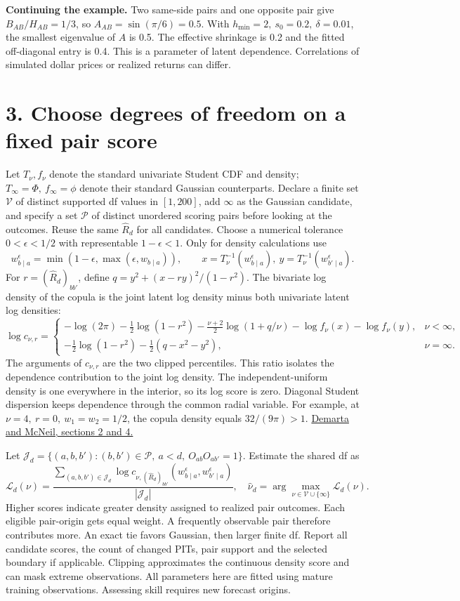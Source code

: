 \documentclass[11pt,letterpaper]{article}
\newcommand{\sect}[1]{\section*{\color{ink}#1}}
\newcommand{\lead}[1]{\textbf{\textcolor{accent}{#1}}}
\newcommand{\edge}{\mathcal P}
\newcommand{\src}[2]{\href{#1}{#2}}
\begin{document}
\lead{Continuing the example.} Two same-side pairs and one opposite pair give \(B_{AB}/H_{AB}=1/3\), so \(A_{AB}=\sin(\pi/6)=0.5\). With \(h_{\min}=2,\ s_0=0.2,\ \delta=0.01\), the smallest eigenvalue of \(A\) is 0.5. The effective shrinkage is 0.2 and the fitted off-diagonal entry is 0.4. This is a parameter of latent dependence. Correlations of simulated dollar prices or realized returns can differ.

\newpage
\sect{3. Choose degrees of freedom on a fixed pair score}
Let \(T_\nu,f_\nu\) denote the standard univariate Student CDF and density; \(T_\infty=\Phi,\ f_\infty=\phi\) denote their standard Gaussian counterparts. Declare a finite set \(\mathcal V\) of distinct supported df values in \( [1,200] \), add \(\infty\) as the Gaussian candidate, and specify a set \(\edge\) of distinct unordered scoring pairs before looking at the outcomes. Reuse the same \(\widehat R_d\) for all candidates. Choose a numerical tolerance \(0<\epsilon<1/2\) with representable \(1-\epsilon<1\). Only for density calculations use
\[
 w^\epsilon_{b\mid a}=\min(1-\epsilon,\max(\epsilon,w_{b\mid a})),
 \qquad x=T_\nu^{-1}(w^\epsilon_{b\mid a}),\
 y=T_\nu^{-1}(w^\epsilon_{b'\mid a}).
\]
For \(r=(\widehat R_d)_{bb'}\), define \(q=y^2+(x-ry)^2/(1-r^2)\). The bivariate log density of the copula is the joint latent log density minus both univariate latent log densities:
\[
 \log c_{\nu,r}=
 \begin{cases}
 -\log(2\pi)-\tfrac12\log(1-r^2)-\tfrac{\nu+2}{2}\log(1+q/\nu)
 -\log f_\nu(x)-\log f_\nu(y), & \nu<\infty,\\[2pt]
 -\tfrac12\log(1-r^2)-\tfrac12(q-x^2-y^2), &\nu=\infty .
 \end{cases}
\]
The arguments of \(c_{\nu,r}\) are the two clipped percentiles. This ratio isolates the dependence contribution to the joint log density. The independent-uniform density is one everywhere in the interior, so its log score is zero. Diagonal Student dispersion keeps dependence through the common radial variable. For example, at \(\nu=4,\ r=0,\ w_1=w_2=1/2\), the copula density equals \(32/(9\pi)>1\). \src{https://doi.org/10.1111/j.1751-5823.2005.tb00254.x}{Demarta and McNeil, sections 2 and 4.}

Let \(\mathcal J_d=\{(a,b,b'): (b,b')\in\edge,\ a<d,\ O_{ab}O_{ab'}=1\}\). Estimate the shared df as
\[
 \mathcal L_d(\nu)=\frac{\sum_{(a,b,b')\in\mathcal J_d}
 \log c_{\nu,(\widehat R_d)_{bb'}}(w^\epsilon_{b\mid a},w^\epsilon_{b'\mid a})}
 {|\mathcal J_d|},\quad
 \widehat\nu_d=\arg\max_{\nu\in\mathcal V\cup\{\infty\}}\mathcal L_d(\nu).
\]
Higher scores indicate greater density assigned to realized pair outcomes. Each eligible pair-origin gets equal weight. A frequently observable pair therefore contributes more. An exact tie favors Gaussian, then larger finite df. Report all candidate scores, the count of changed PITs, pair support and the selected boundary if applicable. Clipping approximates the continuous density score and can mask extreme observations. All parameters here are fitted using mature training observations. Assessing skill requires new forecast origins.
\end{document}
